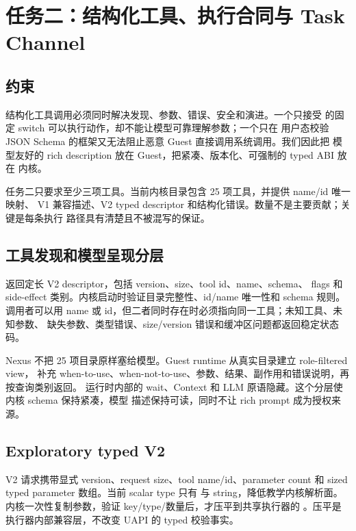 \chapter{任务二：结构化工具、执行合同与 Task Channel}
\label{chap:task2}

\section{约束}

结构化工具调用必须同时解决发现、参数、错误、安全和演进。一个只接受
 的固定 switch 可以执行动作，却不能让模型可靠理解参数；一个只在
用户态校验 JSON Schema 的框架又无法阻止恶意 Guest 直接调用系统调用。我们因此把
模型友好的 rich description 放在 Guest，把紧凑、版本化、可强制的 typed ABI 放在
内核。

任务二只要求至少三项工具。当前内核目录包含 25 项工具，并提供 name/id 唯一映射、
V1 兼容描述、V2 typed descriptor 和结构化错误。数量不是主要贡献；关键是每条执行
路径具有清楚且不被混写的保证。

\section{工具发现和模型呈现分层}

 返回定长 V2 descriptor，包括 version、size、tool id、name、schema、
flags 和 side-effect 类别。内核启动时验证目录完整性、id/name 唯一性和 schema 规则。
调用者可以用 name 或 id，但二者同时存在时必须指向同一工具；未知工具、未知参数、
缺失参数、类型错误、size/version 错误和缓冲区问题都返回稳定状态码。

Nexus 不把 25 项目录原样塞给模型。Guest runtime 从真实目录建立 role-filtered view，
补充 when-to-use、when-not-to-use、参数、结果、副作用和错误说明，再按查询类别返回。
运行时内部的 wait、Context 和 LLM 原语隐藏。这个分层使内核 schema 保持紧凑，模型
描述保持可读，同时不让 rich prompt 成为授权来源。

\section{Exploratory typed V2}

V2 请求携带显式 version、request size、tool name/id、parameter count 和 sized typed
parameter 数组。当前 scalar type 只有  与 string，降低教学内核解析面。
内核一次性复制参数，验证 key/type/数量后，才压平到共享执行器的
。压平是执行器内部兼容层，不改变 UAPI 的 typed
校验事实。

